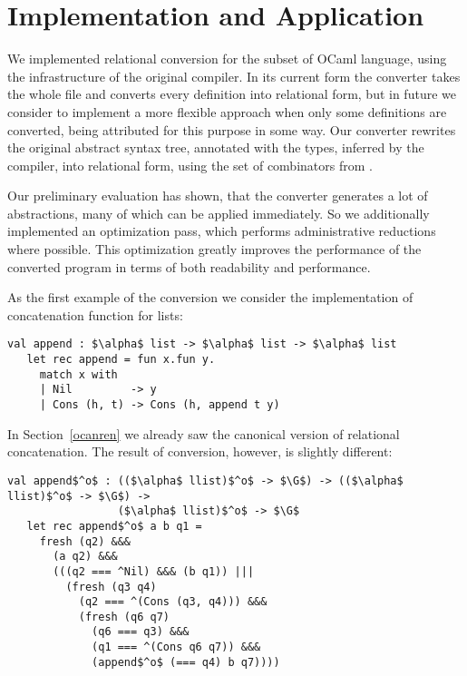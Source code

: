 \section{Implementation and Application}
\label{evaluation}

We implemented relational conversion for the subset of OCaml language, using the infrastructure of the 
original compiler. In its current form the converter takes the whole file and converts every definition into relational form, 
but in future we consider to implement a more flexible approach when only some definitions are converted, being attributed
for this purpose in some way. Our converter rewrites the original abstract syntax tree, annotated with the types, inferred by the compiler, 
into relational form, using the set of combinators from \ocanren.  

Our preliminary evaluation has shown, that the converter generates a lot of abstractions, many of which can be applied immediately.
So we additionally implemented an optimization pass, which performs administrative reductions where possible. This optimization
greatly improves the performance of the converted program in terms of both readability and performance.

As the first example of the conversion we consider the implementation of concatenation function for lists:

\begin{lstlisting}[basicstyle=\small]
   val append : $\alpha$ list -> $\alpha$ list -> $\alpha$ list
   let rec append = fun x.fun y.
     match x with
     | Nil         -> y
     | Cons (h, t) -> Cons (h, append t y)
\end{lstlisting}

In Section~\ref{ocanren} we already saw the canonical version of relational concatenation. The result of conversion, however,
is slightly different:

\begin{lstlisting}[basicstyle=\small]
   val append$^o$ : (($\alpha$ llist)$^o$ -> $\G$) -> (($\alpha$ llist)$^o$ -> $\G$) -> 
                 ($\alpha$ llist)$^o$ -> $\G$
   let rec append$^o$ a b q1 =
     fresh (q2) &&&
       (a q2) &&&
       (((q2 === ^Nil) &&& (b q1)) |||
         (fresh (q3 q4)
           (q2 === ^(Cons (q3, q4))) &&&
           (fresh (q6 q7)
             (q6 === q3) &&&             
             (q1 === ^(Cons q6 q7)) &&&
             (append$^o$ (=== q4) b q7))))
\end{lstlisting}

